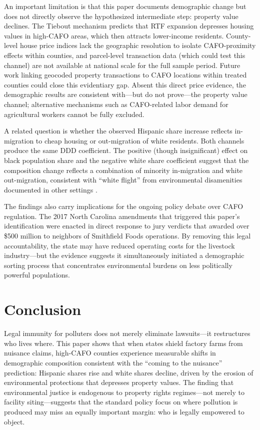 \documentclass[12pt]{article}
\begin{document}
An important limitation is that this paper documents demographic change but does not directly observe the hypothesized intermediate step: property value declines. The Tiebout mechanism predicts that RTF expansion depresses housing values in high-CAFO areas, which then attracts lower-income residents. County-level house price indices lack the geographic resolution to isolate CAFO-proximity effects within counties, and parcel-level transaction data (which could test this channel) are not available at national scale for the full sample period. Future work linking geocoded property transactions to CAFO locations within treated counties could close this evidentiary gap. Absent this direct price evidence, the demographic results are consistent with---but do not prove---the property value channel; alternative mechanisms such as CAFO-related labor demand for agricultural workers cannot be fully excluded.

A related question is whether the observed Hispanic share increase reflects in-migration to cheap housing or out-migration of white residents. Both channels produce the same DDD coefficient. The positive (though insignificant) effect on black population share and the negative white share coefficient suggest that the composition change reflects a combination of minority in-migration and white out-migration, consistent with ``white flight'' from environmental disamenities documented in other settings \citep{banzhaf2006siting}.

The findings also carry implications for the ongoing policy debate over CAFO regulation. The 2017 North Carolina amendments that triggered this paper's identification were enacted in direct response to jury verdicts that awarded over \$500 million to neighbors of Smithfield Foods operations. By removing this legal accountability, the state may have reduced operating costs for the livestock industry---but the evidence suggests it simultaneously initiated a demographic sorting process that concentrates environmental burdens on less politically powerful populations.

\section{Conclusion}

Legal immunity for polluters does not merely eliminate lawsuits---it restructures who lives where. This paper shows that when states shield factory farms from nuisance claims, high-CAFO counties experience measurable shifts in demographic composition consistent with the ``coming to the nuisance'' prediction: Hispanic shares rise and white shares decline, driven by the erosion of environmental protections that depresses property values. The finding that environmental justice is endogenous to property rights regimes---not merely to facility siting---suggests that the standard policy focus on where pollution is produced may miss an equally important margin: who is legally empowered to object.
\end{document}
